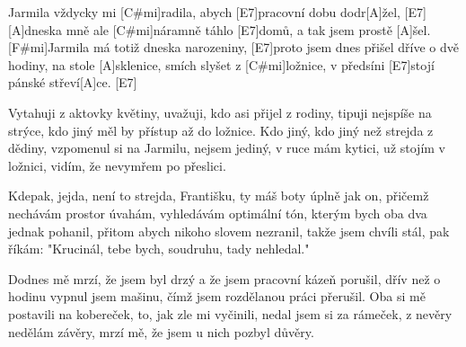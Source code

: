 
\sloka
[A]Jarmila vždycky mi [C#mi]radila,
abych [E7]pracovní dobu dodr[A]žel, [E7]
[A]dneska mně ale [C#mi]náramně
táhlo [E7]domů, a tak jsem prostě [A]šel.
[F#mi]Jarmila má totiž dneska narozeniny,
[E7]proto jsem dnes přišel dříve o dvě hodiny,
na stole [A]sklenice, smích slyšet z [C#mi]ložnice,
v předsíni [E7]stojí pánské střeví[A]ce. [E7]

\sloka
Vytahuji z aktovky květiny,
uvažuji, kdo asi přijel z rodiny,
tipuji nejspíše na strýce,
kdo jiný měl by přístup až do ložnice.
Kdo jiný, kdo jiný než strejda z dědiny,
vzpomenul si na Jarmilu, nejsem jediný,
v ruce mám kytici, už stojím v ložnici,
vidím, že nevymřem po přeslici.

\sloka
Kdepak, jejda, není to strejda,
Františku, ty máš boty úplně jak on,
přičemž nechávám prostor úvahám,
vyhledávám optimální tón,
kterým bych oba dva jednak pohanil,
přitom abych nikoho slovem nezranil,
takže jsem chvíli stál, pak říkám: "Krucinál,
tebe bych, soudruhu, tady nehledal."

\sloka
Dodnes mě mrzí, že jsem byl drzý
a že jsem pracovní kázeň porušil,
dřív než o hodinu vypnul jsem mašinu,
čímž jsem rozdělanou práci přerušil.
Oba si mě postavili na kobereček,
to, jak zle mi vyčinili, nedal jsem si za rámeček,
z nevěry nedělám závěry,
mrzí mě, že jsem u nich pozbyl důvěry.
